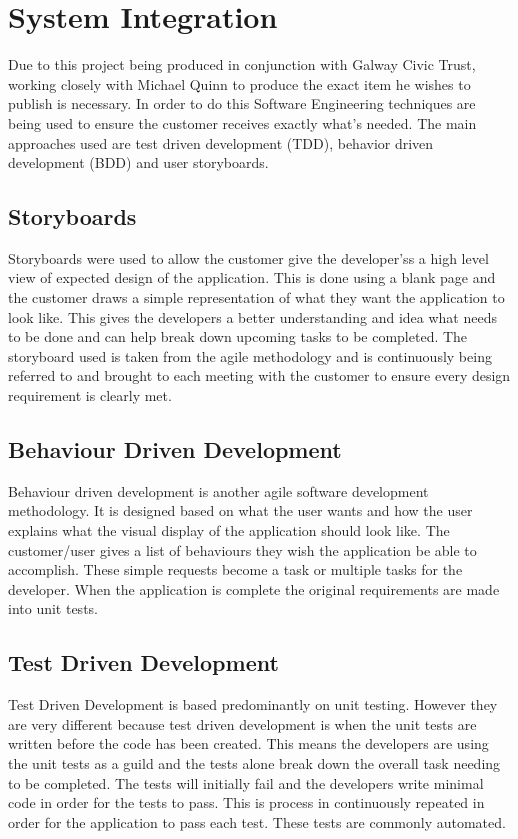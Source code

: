 \section{System Integration}
Due to this project being produced in conjunction with Galway Civic Trust, working closely with Michael Quinn to produce the exact item he wishes to publish is necessary. In order to do this Software Engineering techniques are being used to ensure the customer receives exactly what’s needed. The main approaches used are test driven development (TDD), behavior driven development (BDD) and user storyboards.

\subsection{Storyboards}

Storyboards were used to allow the customer give the developer’ss a high level view of expected design of the application. This is done using a blank page and the customer draws a simple representation of what they want the application to look like. This gives the developers a better understanding and idea what needs to be done and can help break down upcoming tasks to be completed. The storyboard used is taken from the agile methodology and is continuously being referred to and brought to each meeting with the customer to ensure every design requirement is clearly met. \cite{StoryBoard}

\subsection{Behaviour Driven Development}

Behaviour driven development is another agile software development methodology. It is designed based on what the user wants and how the user explains what the visual display of the application should look like. The customer/user gives a list of behaviours they wish the application be able to accomplish. These simple requests become a task or multiple tasks for the developer. When the application is complete the original requirements are made into unit tests.\cite{BDD} 

\subsection{Test Driven Development}

Test Driven Development is based predominantly on unit testing. However they are very different because test driven development is when the unit tests are written before the code has been created. This means the developers are using the unit tests as a guild and the tests alone break down the overall task needing to be completed. The tests will initially fail and the developers write minimal code in order for the tests to pass. This is process in continuously repeated in order for the application to pass each test. These tests are commonly automated.\cite{TDD}

